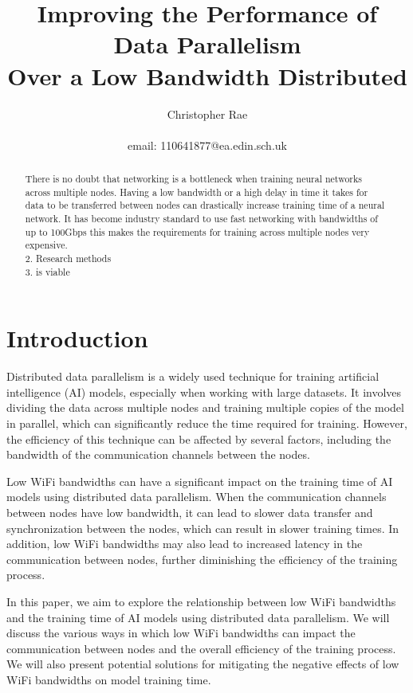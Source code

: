 \documentclass[11pt]{article}
\title{Improving the Performance of Data Parallelism \\Over a Low Bandwidth Distributed }
\author{Christopher Rae \\ \begin{small} email: 110641877@ea.edin.sch.uk \end{small}}
\date{}
\begin{document}
\maketitle
\tableofcontents
\newpage

\begin{abstract}
There is no doubt that networking is a bottleneck when training neural networks across multiple nodes. Having a low bandwidth or a high delay in time it takes for data to be transferred between nodes can drastically increase training time of a neural network. It has become industry standard to use fast networking with bandwidths of up to 100Gbps this makes the requirements for training across multiple nodes very expensive. \\
2. Research methods\\
3. is viable
\end{abstract}


\section{Introduction}
Distributed data parallelism is a widely used technique for training artificial intelligence (AI) models, especially when working with large datasets. It involves dividing the data across multiple nodes and training multiple copies of the model in parallel, which can significantly reduce the time required for training. However, the efficiency of this technique can be affected by several factors, including the bandwidth of the communication channels between the nodes.

Low WiFi bandwidths can have a significant impact on the training time of AI models using distributed data parallelism. When the communication channels between nodes have low bandwidth, it can lead to slower data transfer and synchronization between the nodes, which can result in slower training times. In addition, low WiFi bandwidths may also lead to increased latency in the communication between nodes, further diminishing the efficiency of the training process.

In this paper, we aim to explore the relationship between low WiFi bandwidths and the training time of AI models using distributed data parallelism. We will discuss the various ways in which low WiFi bandwidths can impact the communication between nodes and the overall efficiency of the training process. We will also present potential solutions for mitigating the negative effects of low WiFi bandwidths on model training time.
\end{document}
